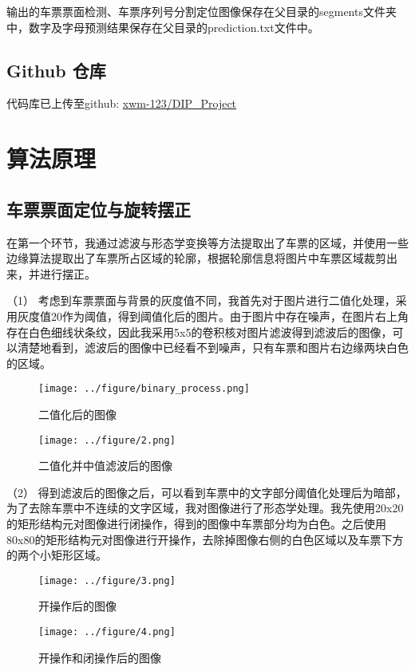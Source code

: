 \documentclass[11pt]{ctexart}
\begin{document}
	输出的车票票面检测、车票序列号分割定位图像保存在父目录的segments文件夹中，数字及字母预测结果保存在父目录的prediction.txt文件中。
	
	\subsection{Github 仓库}
	代码库已上传至github: \href{https://github.com/xwm-123/DIP_Project}{xwm-123/DIP\_Project}
	
	\section{算法原理}
	\subsection{车票票面定位与旋转摆正}
	在第一个环节，我通过滤波与形态学变换等方法提取出了车票的区域，并使用一些边缘算法提取出了车票所占区域的轮廓，根据轮廓信息将图片中车票区域裁剪出来，并进行摆正。
	
	（1） 考虑到车票票面与背景的灰度值不同，我首先对于图片进行二值化处理，采用灰度值20作为阈值，得到阈值化后的图片。由于图片中存在噪声，在图片右上角存在白色细线状条纹，因此我采用5x5的卷积核对图片滤波得到滤波后的图像，可以清楚地看到，滤波后的图像中已经看不到噪声，只有车票和图片右边缘两块白色的区域。
	
	\begin{figure}[h]
		\begin{minipage}[H]{0.5\linewidth}
			\centering
			\texttt{[image: ../figure/binary\_process.png]}
			\caption{二值化后的图像}
		\end{minipage}%
		\begin{minipage}[H]{0.5\linewidth}
			\centering
			\texttt{[image: ../figure/2.png]}
			\caption{二值化并中值滤波后的图像}
		\end{minipage}
	\end{figure}
	
	（2） 得到滤波后的图像之后，可以看到车票中的文字部分阈值化处理后为暗部，为了去除车票中不连续的文字区域，我对图像进行了形态学处理。我先使用20x20的矩形结构元对图像进行闭操作，得到的图像中车票部分均为白色。之后使用80x80的矩形结构元对图像进行开操作，去除掉图像右侧的白色区域以及车票下方的两个小矩形区域。
	
	\begin{figure}[h]
		\begin{minipage}[H]{0.5\linewidth}
			\centering
			\texttt{[image: ../figure/3.png]}
			\caption{开操作后的图像}
		\end{minipage}%
		\begin{minipage}[H]{0.5\linewidth}
			\centering
			\texttt{[image: ../figure/4.png]}
			\caption{开操作和闭操作后的图像}
		\end{minipage}
	\end{figure}
	
\end{document}

